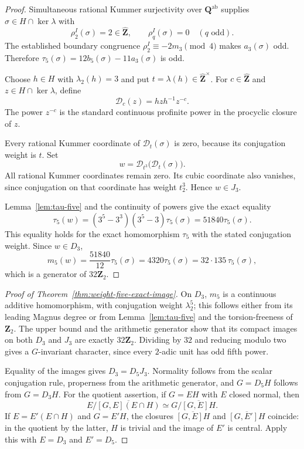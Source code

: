 \begin{proof}
Simultaneous rational Kummer surjectivity over
$\mathbf Q^{\mathrm{ab}}$ supplies $\sigma\in H\cap\ker\lambda$
with
\[
 \rho_2^I(\sigma)=2\in\widehat{\mathbf Z},\qquad
 \rho_q^I(\sigma)=0\quad(q\text{ odd}).
\]
The established boundary congruence
$\rho_2^I\equiv-2m_3\pmod4$ makes $a_3(\sigma)$ odd.
Therefore $\tau_5(\sigma)=12b_5(\sigma)-11a_3(\sigma)$ is odd.

Choose $h\in H$ with $\lambda_2(h)=3$ and put
$t=\lambda(h)\in\widehat{\mathbf Z}^{\times}$.  For
$c\in\widehat{\mathbf Z}$ and $z\in H\cap\ker\lambda$, define
\[
 \mathcal D_c(z)=hzh^{-1}z^{-c}.
\]
The power $z^{-c}$ is the standard continuous profinite power
in the procyclic closure of $z$.

Every rational Kummer coordinate of $\mathcal D_t(\sigma)$
is zero, because its conjugation weight is $t$.  Set
\[
 w=\mathcal D_{t^3}\bigl(\mathcal D_t(\sigma)\bigr).
\]
All rational Kummer coordinates remain zero.  Its cubic
coordinate also vanishes, since conjugation on that coordinate
has weight $t_2^3$.  Hence $w\in J_3$.

Lemma~\ref{lem:tau-five} and the continuity of powers give the
exact equality
\[
 \tau_5(w)=(3^5-3^3)(3^5-3)\tau_5(\sigma)
          =51840\tau_5(\sigma).
\]
This equality holds for the exact homomorphism $\tau_5$ with the
stated conjugation weight.  Since $w\in D_3$,
\[
 m_5(w)=\frac{51840}{12}\tau_5(\sigma)
       =4320\tau_5(\sigma)
       =32\cdot135\,\tau_5(\sigma),
\]
which is a generator of $32\mathbf Z_2$.
\end{proof}

\begin{proof}[Proof of Theorem~\ref{thm:weight-five-exact-image}]
On $D_3$, $m_5$ is a continuous additive homomorphism, with
conjugation weight $\lambda_2^5$; this follows either from its
leading Magnus degree or from Lemma~\ref{lem:tau-five} and
the torsion-freeness of $\mathbf Z_2$.  The upper bound and
the arithmetic generator show that its compact images on
both $D_3$ and $J_3$ are exactly $32\mathbf Z_2$.  Dividing
by $32$ and reducing modulo two gives a $G$-invariant
character, since every $2$-adic unit has odd fifth power.

Equality of the images gives $D_3=D_5J_3$.  Normality follows
from the scalar conjugation rule, properness from the
arithmetic generator, and $G=D_5H$ follows from $G=D_3H$.
For the quotient assertion, if $G=EH$ with $E$ closed normal,
then
\[
 E/\overline{[G,E](E\cap H)}
 \simeq G/\overline{[G,E]H}.
\]
If $E=E'(E\cap H)$ and $G=E'H$, the closures
$\overline{[G,E]H}$ and $\overline{[G,E']H}$ coincide: in
the quotient by the latter, $H$ is trivial and the image
of $E'$ is central.  Apply this with $E=D_3$ and $E'=D_5$.
\end{proof}

